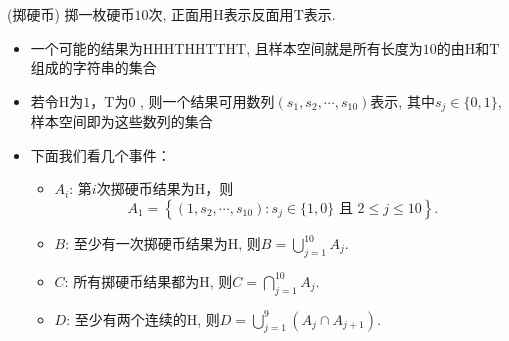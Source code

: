 \begin{frame}
	 \begin{exam} (掷硬币) 掷一枚硬币$10$次, 正面用${\mathrm{H}}$表示反面用${\mathrm{T}}$表示.
	 	    \begin{itemize}[<+-|alert@+>]
	 	    	\item 一个可能的结果为{\rm HHHTHHTTHT}, \pause 且样本空间就是所有长度为$10$的由${\mathrm{H}}$和${\mathrm{T}}$组成的字符串的集合
	 	    	\item 若令${\mathrm{H}}$为$1$，${\mathrm{T}}$为$0$ , 则一个结果可用数列${\left(s_{1}, s_{2}, \cdots, s_{10}\right)}$表示, 其中${s_{j} \in\{0,1\}}$, 样本空间即为这些数列的集合
	 	    	\item 下面我们看几个事件：
   		 	    \begin{itemize}[<+-|alert@+>]
	\item ${A_{i}}$: 第$i$次掷硬币结果为${\mathrm{H}}$，则\pause
	\[
	A_{1}=\left\{\left(1, s_{2}, \cdots, s_{10}\right): s_{j} \in\{1,0\} \text{ 且 } 2 \leqslant j \leqslant 10\right\}.
	\]
	\item %
	${B}$: 至少有一次掷硬币结果为${\mathrm{H}}$, 则\pause $B=\bigcup_{j=1}^{10} A_{j}.$
	\item ${C}$: 所有掷硬币结果都为${\mathrm{H}}$, 则\pause $C=\bigcap_{j=1}^{10} A_{j}.$
	\item ${D}$: 至少有两个连续的${\mathrm{H}}$,  则\pause $D=\bigcup_{j=1}^{9}\left(A_{j} \cap A_{j+1}\right).$
	    \end{itemize}
    	    \end{itemize}
	  \end{exam}
\end{frame}
